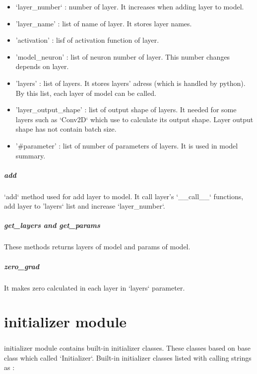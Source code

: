 \documentclass[12pt]{report}
\begin{document}
\begin{itemize}
	\item `layer\_number` : number of layer. It increases when adding layer to model. 
	\item 'layer\_name' : list of name of layer. It stores layer names. 
	\item 'activation' : lisf of activation function of layer. 
	\item 'model\_neuron' : list of neuron number of layer. This number changes depends on layer. 
	\item 'layers' : list of layers. It stores layers' adress (which is handled by python). By this list, each layer of model can be called.
	\item 'layer\_output\_shape' : list of output shape of layers. It needed for some layers such as `Conv2D` which use to calculate its output shape. Layer output shape has not contain batch size.
	\item '\#parameter' : list of number of parameters of layers. It is used in model summary.
\end{itemize}

\paragraph{add}
`add` method used for add layer to model. It call layer's `\_\_call\_\_` functions, add layer to 'layers` list and increase `layer\_number`.

\paragraph{get\_layers and get\_params}
These methods returns layers of model and params of model.

\paragraph{zero\_grad}
It makes zero calculated in each layer in `layers` parameter.







\chapter{initializer module}

\paragraph{}
initializer module contains built-in initializer classes. These classes based on base class which called `Initializer`. Built-in initializer classes listed with calling strings as : 
\end{document}
